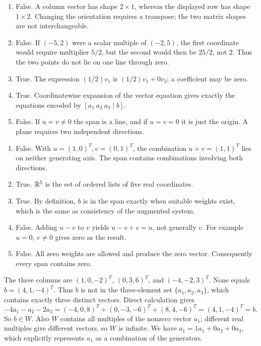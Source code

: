 \begin{enumerate}[label=(\alph*)]
\item False. A column vector has shape $2\times1$, whereas the displayed
row has shape $1\times2$. Changing the orientation requires a transpose;
the two matrix shapes are not interchangeable.
\item False. If $(-5,2)$ were a scalar multiple of $(-2,5)$, the first
coordinate would require multiplier $5/2$, but the second would then be
$25/2$, not $2$. Thus the two points do not lie on one line through zero.
\item True. The expression $(1/2)v_1$ is $(1/2)v_1+0v_2$;
a coefficient may be zero.
\item True. Coordinatewise expansion of the vector equation gives
exactly the equations encoded by $[a_1\ a_2\ a_3\mid b]$.
\item False. If $u=v\ne0$ the span is a line, and if $u=v=0$ it
is just the origin. A plane requires two independent directions.
\end{enumerate}

\begin{enumerate}[label=(\alph*)]
\item False. With $u=(1,0)^T,v=(0,1)^T$, the combination
$u+v=(1,1)^T$ lies on neither generating axis. The span contains
combinations involving both directions.
\item True. $\mathbb{R}^5$ is the set of ordered lists of five real coordinates.
\item True. By definition, $b$ is in the span exactly when suitable
weights exist, which is the same as consistency of the augmented system.
\item False. Adding $u-v$ to $v$ yields $u-v+v=u$, not generally $v$.
For example $u=0$, $v\ne0$ gives zero as the result.
\item False. All zero weights are allowed and produce the zero vector.
Consequently every span contains zero.
\end{enumerate}

The three columns are $(1,0,-2)^T$, $(0,3,6)^T$, and $(-4,-2,3)^T$.
None equals $b=(4,1,-4)^T$. Thus $b$ is not in the three-element set
$\{a_1,a_2,a_3\}$, which contains exactly three distinct vectors.
Direct calculation gives
\[
-4a_1-a_2-2a_3=(-4,0,8)^T+(0,-3,-6)^T+(8,4,-6)^T
=(4,1,-4)^T=b.
\]
So $b\in W$. Also $W$ contains all multiples of the nonzero vector
$a_1$; different real multiples give different vectors, so $W$ is infinite.
We have $a_1=1a_1+0a_2+0a_3$, which explicitly represents $a_1$
as a combination of the generators.

